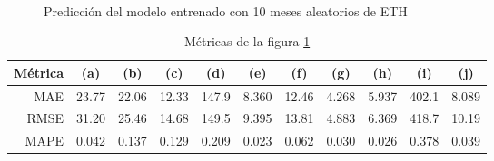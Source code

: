 \documentclass[a4paper,10pt]{article}
\begin{document}
\begin{figure}[H]
    \\
  \caption{Predicción del modelo entrenado con 10 meses aleatorios de ETH}
  \label{f:eth_mth_arima}
\end{figure}

\begin{table}[H]
 \begin{center}
  \begin{tabular}{|r|c|c|c|c|c|c|c|c|c|c|}
    Métrica & (a) & (b) & (c) & (d) & (e) & (f) & (g) & (h) & (i) & (j) \\ \hline
    MAE & 23.77 & 22.06 & 12.33 & 147.9 & 8.360 & 12.46 & 4.268 & 5.937 & 402.1 & 8.089 \\
    RMSE & 31.20 & 25.46 & 14.68 & 149.5 & 9.395 & 13.81 & 4.883 & 6.369 & 418.7 & 10.19 \\
    MAPE & 0.042 & 0.137 & 0.129 & 0.209 & 0.023 & 0.062 & 0.030 & 0.026 & 0.378 & 0.039 \\ \hline
  \end{tabular}
  \caption{Métricas de la figura \ref{f:eth_mth_arima}}
  \label{tab:eth_m}
 \end{center}
\end{table}
\end{document}
